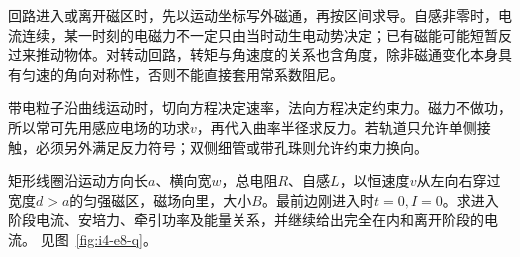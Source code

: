 回路进入或离开磁区时，先以运动坐标写外磁通，再按区间求导。自感非零时，电流连续，某一时刻的电磁力不一定只由当时动生电动势决定；已有磁能可能短暂反过来推动物体。对转动回路，转矩与角速度的关系也含角度，除非磁通变化本身具有匀速的角向对称性，否则不能直接套用常系数阻尼。

带电粒子沿曲线运动时，切向方程决定速率，法向方程决定约束力。磁力不做功，所以常可先用感应电场的功求$v$，再代入曲率半径求反力。若轨道只允许单侧接触，必须另外满足反力符号；双侧细管或带孔珠则允许约束力换向。


\begin{example}[矩形线圈匀速穿过有限磁区]\label{ex:i4-e8}

矩形线圈沿运动方向长$a$、横向宽$w$，总电阻$R$、自感$L$，以恒速度$v$从左向右穿过宽度$d>a$的匀强磁区，磁场向里，大小$B$。最前边刚进入时$t=0,I=0$。求进入阶段电流、安培力、牵引功率及能量关系，并继续给出完全在内和离开阶段的电流。
 见图~\ref{fig:i4-e8-q}。
\end{example}

